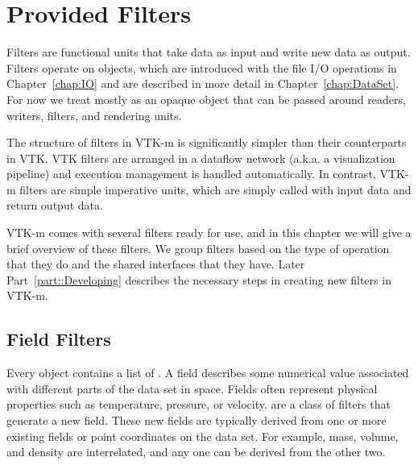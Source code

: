 
\chapter{Provided Filters}
\label{chap:ProvidedFilters}


Filters are functional units that take data as input and write new data as
output. Filters operate on  objects, which are introduced
with the file I/O operations in Chapter~\ref{chap:IO} and are described in
more detail in Chapter~\ref{chap:DataSet}. For now we treat
 mostly as an opaque object that can be passed
around readers, writers, filters, and rendering units.

\begin{didyouknow}
  The structure of filters in VTK-m is significantly simpler than their
  counterparts in VTK. VTK filters are arranged in a dataflow network
  (a.k.a. a visualization pipeline) and execution management is handled
  automatically. In contrast, VTK-m filters are simple imperative units,
  which are simply called with input data and return output data.
\end{didyouknow}

VTK-m comes with several filters ready for use, and in this chapter we will
give a brief overview of these filters. We group filters based on the type
of operation that they do and the shared interfaces that they have. Later
Part~\ref{part::Developing} describes the necessary steps in creating new
filters in VTK-m.


\section{Field Filters}


Every  object contains a list of 
. A field describes some numerical value associated with
different parts of the data set in space. Fields often represent physical
properties such as temperature, pressure, or velocity.  are a class of filters that generate a new field. These new
fields are typically derived from one or more existing fields or point
coordinates on the data set. For example, mass, volume, and density are
interrelated, and any one can be derived from the other two.

